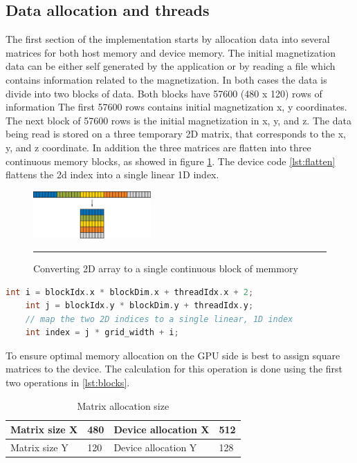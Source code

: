 \subsection{Data allocation and threads}

The first section of the implementation starts by allocation data into several matrices for both host memory and device memory. The initial magnetization data can be either self generated by the application or by reading a file which contains information related to the magnetization. In both cases the data is divide into two blocks of data. Both blocks have 57600 (480 x 120) rows of information The first 57600 rows contains initial magnetization x, y coordinates. The next block of 57600 rows is the initial magnetization in x, y, and z. The data being read is stored on a three temporary 2D matrix, that corresponds to the x, y, and z coordinate. In addition the three matrices are flatten into three continuous memory blocks, as showed in figure \ref{fig:flaten}. The device code \ref{lst:flatten} flattens the 2d index into a single linear 1D index.

\begin{figure}[htbp]
	\centering
		\includegraphics[width=0.4\textwidth]{Figures/flaten.png}
		\rule{35em}{0.2pt}
	\caption[2D Flatten array]{Converting 2D array to a single continuous block of memmory}
	\label{fig:flaten}
\end{figure}

\begin{lstlisting}[language=C++, label={lst:flatten}, caption={Kernel Flatten}]	
    int i = blockIdx.x * blockDim.x + threadIdx.x + 2;
    int j = blockIdx.y * blockDim.y + threadIdx.y;
    // map the two 2D indices to a single linear, 1D index
    int index = j * grid_width + i;
\end{lstlisting}

To ensure optimal memory allocation on the GPU side is best to assign square matrices to the device. The calculation for this operation is done using the first two operations in \ref{lst:blocks}.

\begin{table}[h]
\centering
\begin{tabular}{| l | l | l | l | }
\hline
Matrix size X & 480 & Device allocation X & 512\\
\hline
Matrix size Y & 120 & Device allocation Y & 128 \\
\hline
\end{tabular}
\caption{Matrix allocation size}
\label{tab:cuda}
\end{table}

